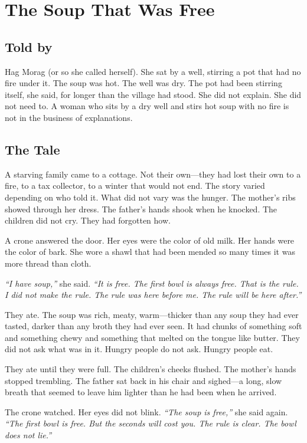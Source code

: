 \chapter{The Soup That Was Free}

\section*{Told by}
Hag Morag (or so she called herself). She sat by a well, stirring a pot that had no fire under it. The soup was hot. The well was dry. The pot had been stirring itself, she said, for longer than the village had stood. She did not explain. She did not need to. A woman who sits by a dry well and stirs hot soup with no fire is not in the business of explanations.

\section*{The Tale}

A starving family came to a cottage. Not their own---they had lost their own to a fire, to a tax collector, to a winter that would not end. The story varied depending on who told it. What did not vary was the hunger. The mother's ribs showed through her dress. The father's hands shook when he knocked. The children did not cry. They had forgotten how.

A crone answered the door. Her eyes were the color of old milk. Her hands were the color of bark. She wore a shawl that had been mended so many times it was more thread than cloth.

\textit{``I have soup,''} she said. \textit{``It is free. The first bowl is always free. That is the rule. I did not make the rule. The rule was here before me. The rule will be here after.''}

They ate. The soup was rich, meaty, warm---thicker than any soup they had ever tasted, darker than any broth they had ever seen. It had chunks of something soft and something chewy and something that melted on the tongue like butter. They did not ask what was in it. Hungry people do not ask. Hungry people eat.

They ate until they were full. The children's cheeks flushed. The mother's hands stopped trembling. The father sat back in his chair and sighed---a long, slow breath that seemed to leave him lighter than he had been when he arrived.

The crone watched. Her eyes did not blink. \textit{``The soup is free,''} she said again. \textit{``The first bowl is free. But the seconds will cost you. The rule is clear. The bowl does not lie.''}

